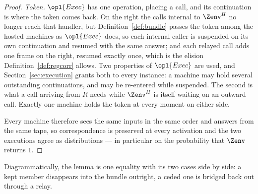 \documentclass[10pt,oneside,openany]{book}
\theoremstyle{accentdef}
\theoremstyle{accentplain}
\begin{document}
\begin{proof}
\emph{Token.} $\opl{Exec}$ has one operation, placing a call, and its continuation is where the token
comes back. On the right the calls internal to $\Zenv^{H}$ no longer reach that handler, but
Definition~\ref{def:bundle} passes the token among the hosted machines as $\opl{Exec}$ does, so each
internal caller is suspended on its own continuation and resumed with the same answer; and each
relayed call adds one frame on the right, resumed exactly once, which is the elision
Definition~\ref{def:regcorr} allows. Two properties of $\opl{Exec}$ are used, and
Section~\ref{sec:execution} grants both to every instance: a machine may hold several outstanding
continuations, and may be re-entered while suspended. The second is what a call arriving from $R$
needs while $\Zenv^{H}$ is itself waiting on an outward call. Exactly one machine holds the token at
every moment on either side.

Every machine therefore sees the same inputs in the same order and answers from the same tape, so
correspondence is preserved at every activation and the two executions agree as distributions --- in
particular on the probability that $\Zenv$ returns $1$.
\end{proof}

Diagrammatically, the lemma is one equality with its two cases side by side: a kept member
disappears into the bundle outright, a ceded one is bridged back out through a relay.
\end{document}
